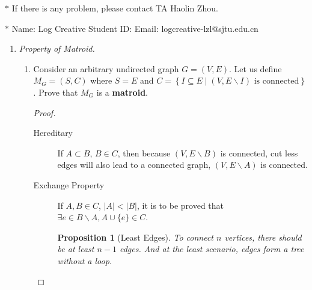 \documentclass[12pt,a4paper]{article}
\newtheorem{proposition}[theorem]{Proposition}
\theoremstyle{definition}
\begin{document}
\noindent

\noindent{}
\begin{center}
\footnotesize{\color{red}$*$ If there is any problem, please contact TA Haolin Zhou.}

\footnotesize{\color{blue}$*$ Name: Log Creative  \quad Student ID:  \quad Email: logcreative-lzl@sjtu.edu.cn}
\end{center}

\begin{enumerate}
\item \textit{Property of Matroid.} 
\begin{enumerate}
	\item
	Consider an arbitrary undirected graph $ G=(V,E) $. Let us define $ M_{G}=(S,C) $ where $ S=E $ and $ C=\left\{I \subseteq E \mid\left(V, E \backslash I\right) \text { is connected}\right\} $. Prove that $ M_{G} $ is a \textbf{matroid}.\par
	\begin{proof}
		\begin{description}
			\item[Hereditary] If $A\subset B$, $B\in C$, then because $(V,E\backslash B)$ is connected, cut less edges will also lead to a connected graph, $(V,E\backslash A)$ is connected.
			\item[Exchange Property] If $A,B\in C$, $|A|<|B|$, it is to be proved that $\exists e\in B\backslash A, A\cup \{e\}\in C$.
			
			\begin{proposition}[Least Edges]
				To connect $n$ vertices, there should be at least $n-1$ edges. And at the least scenario, edges form a tree without a loop.
			\end{proposition}


\end{description}
\end{proof}
\end{enumerate}
\end{enumerate}
\end{document}
